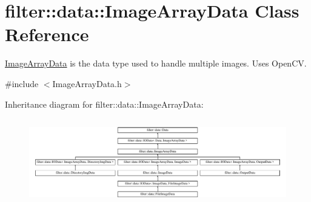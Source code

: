 \hypertarget{classfilter_1_1data_1_1_image_array_data}{}\section{filter\+:\+:data\+:\+:Image\+Array\+Data Class Reference}
\label{classfilter_1_1data_1_1_image_array_data}


\hyperlink{classfilter_1_1data_1_1_image_array_data}{Image\+Array\+Data} is the data type used to handle multiple images. Uses Open\+CV.  




{\ttfamily \#include $<$Image\+Array\+Data.\+h$>$}

Inheritance diagram for filter\+:\+:data\+:\+:Image\+Array\+Data\+:\begin{figure}[H]
\begin{center}
\leavevmode
\includegraphics[height=3.809524cm]{d6/d44/classfilter_1_1data_1_1_image_array_data}
\end{center}
\end{figure}
